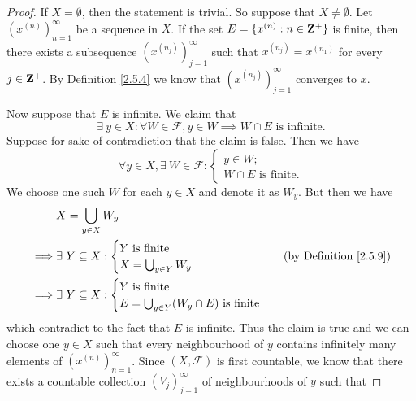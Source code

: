 \begin{proof}
    If \(X = \emptyset\), then the statement is trivial.
    So suppose that \(X \neq \emptyset\).
    Let \((x^{(n)})_{n = 1}^\infty\) be a sequence in \(X\).
    If the set \(E = \{x^{(n)} : n \in \mathbf{Z}^+\}\) is finite, then there exists a subsequence \((x^{(n_j)})_{j = 1}^\infty\) such that \(x^{(n_j)} = x^{(n_1)}\) for every \(j \in \mathbf{Z}^+\).
    By Definition \ref{2.5.4} we know that \((x^{(n_j)})_{j = 1}^\infty\) converges to \(x\).

    Now suppose that \(E\) is infinite.
    We claim that
    \[
        \exists\ y \in X : \forall W \in \mathcal{F}, y \in W \implies W \cap E \text{ is infinite}.
    \]
    Suppose for sake of contradiction that the claim is false.
    Then we have
    \[
        \forall y \in X, \exists\ W \in \mathcal{F} : \begin{cases}
            y \in W; \\
            W \cap E \text{ is finite}.
        \end{cases}
    \]
    We choose one such \(W\) for each \(y \in X\) and denote it as \(W_y\).
    But then we have
    \begin{align*}
                 & X = \bigcup_{y \in X} W_y                                                               \\
        \implies & \exists\ Y \subseteq X : \begin{cases}
                                                Y \text{ is finite} \\
                                                X = \bigcup_{y \in Y} W_y
                                            \end{cases}               & \text{(by Definition \ref{2.5.9})} \\
        \implies & \exists\ Y \subseteq X : \begin{cases}
                                                Y \text{ is finite} \\
                                                E = \bigcup_{y \in Y} (W_y \cap E) \text{ is finite}
                                            \end{cases}
    \end{align*}
    which contradict to the fact that \(E\) is infinite.
    Thus the claim is true and we can choose one \(y \in X\) such that every neighbourhood of \(y\) contains infinitely many elements of \((x^{(n)})_{n = 1}^\infty\).
    Since \((X, \mathcal{F})\) is first countable, we know that there exists a countable collection \((V_j)_{j = 1}^\infty\) of neighbourhoods of \(y\) such that

\end{proof}

